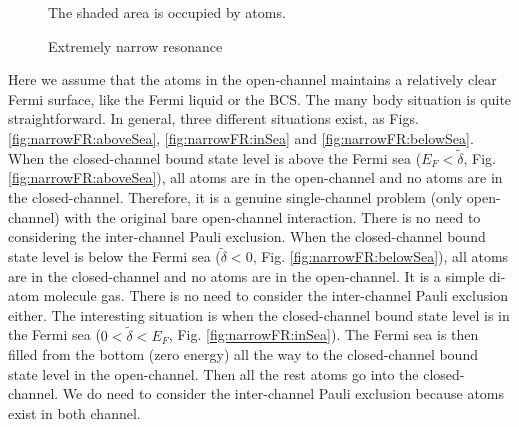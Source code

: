 \begin{figure}[hhtb]
	\centering
	         \quad
		\quad
	\caption{Extremely narrow resonance\label{fig:narrowFR}}
	\small{The shaded area is occupied by atoms. }
\end{figure}
Here we assume that the atoms in the open-channel maintains a relatively clear Fermi surface, like the Fermi liquid or the BCS.  The many body situation is  quite straightforward. In general, three different situations exist, as Figs. \ref{fig:narrowFR:aboveSea}, \ref{fig:narrowFR:inSea} and \ref{fig:narrowFR:belowSea}.  When the closed-channel bound state level is above the Fermi sea ($E_{F}<\tilde\delta$, Fig. \ref{fig:narrowFR:aboveSea}), all atoms are in the open-channel and no atoms are in the closed-channel.  Therefore, it is a genuine  single-channel problem (only open-channel) with the original bare open-channel interaction.   There is no need to considering the inter-channel Pauli exclusion.  When the closed-channel bound state level is below the Fermi sea ($\tilde\delta<0$, Fig. \ref{fig:narrowFR:belowSea}), all atoms are in the closed-channel and no atoms are in the open-channel.  It is a simple di-atom molecule gas. There is no need to consider the inter-channel Pauli exclusion either.  The interesting situation is when the closed-channel bound state level is in the Fermi sea  ($0<\tilde\delta<E_{F}$, Fig. \ref{fig:narrowFR:inSea}).  The Fermi sea is then filled from the bottom (zero energy) all the way to the closed-channel bound state level in the open-channel.  Then all the rest atoms go into the closed-channel.  We do need to consider the inter-channel Pauli exclusion because atoms exist in both channel.  




